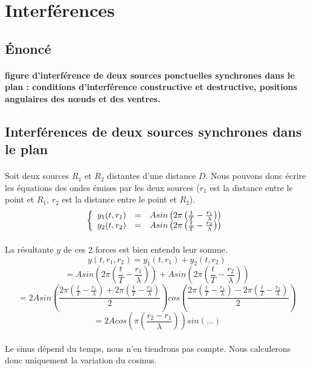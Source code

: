 \documentclass[a4paper]{article}
\begin{document}
\section{Interférences}
\subsection{Énoncé}
\paragraph{}\textbf{figure d'interférence de deux sources ponctuelles synchrones dans le plan : conditions d'interférence constructive et destructive, positions angulaires des nœuds et des ventres.}
\subsection{Interférences de deux sources synchrones dans le plan}
\paragraph{}Soit deux sources $R_1$ et $R_2$ distantes d'une distance $D$. Nous pouvons donc écrire les équations des ondes émises par les deux sources ($r_1$ est la distance entre le point et $R_1$, $r_2$ est la distance entre le point et $R_2$).
\[
\left\{
\begin{array}{r c l}
y_1(t,r_1) &=& Asin\left(2\pi\left(\frac{t}{T}-\frac{r_1}{\lambda}\right)\right)\\
y_2(t,r_2) &=& Asin\left(2\pi\left(\frac{t}{T}-\frac{r_2}{\lambda}\right)\right)\\
\end{array}
\right.
\]
\paragraph{}La résultante $y$ de ces 2 forces est bien entendu leur somme.
\[y(t,r_1,r_2)=y_1(t,r_1)+y_2(t,r_2)\]
\[=Asin\left(2\pi\left(\frac{t}{T}-\frac{r_1}{\lambda}\right)\right)+Asin\left(2\pi\left(\frac{t}{T}-\frac{r_2}{\lambda}\right)\right)\]
\[=2Asin\left(\frac{2\pi\left(\frac{t}{T}-\frac{r_1}{\lambda}\right)+2\pi\left(\frac{t}{T}-\frac{r_2}{\lambda}\right)}{2}\right)cos\left(\frac{2\pi\left(\frac{t}{T}-\frac{r_1}{\lambda}\right)-2\pi\left(\frac{t}{T}-\frac{r_2}{\lambda}\right)}{2}\right)\]
\[=2Acos\left(\pi\left(\frac{r_2-r_1}{\lambda}\right)\right)sin\left(...\right)\]
\paragraph{}Le sinus dépend du temps, nous n'en tiendrons pas compte. Nous calculerons donc uniquement la variation du cosinus.
\end{document}
